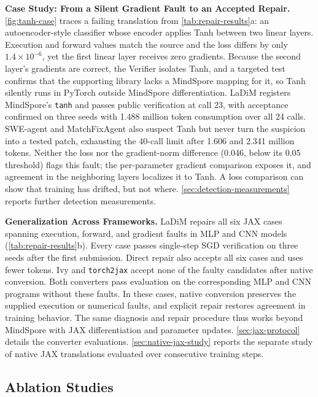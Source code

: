 \textbf{Case Study: From a Silent Gradient Fault to an Accepted Repair.} \cref{fig:tanh-case} traces a failing translation from \cref{tab:repair-results}a: an autoencoder-style classifier whose encoder applies Tanh between two linear layers. Execution and forward values match the source and the loss differs by only $1.4\times10^{-6}$, yet the first linear layer receives zero gradients. Because the second layer's gradients are correct, the Verifier isolates Tanh, and a targeted test confirms that the supporting library lacks a MindSpore mapping for it, so Tanh silently runs in PyTorch outside MindSpore differentiation. LaDiM registers MindSpore's \texttt{tanh} and passes public verification at call 23, with acceptance confirmed on three seeds with 1.488 million token consumption over all 24 calls. SWE-agent and MatchFixAgent also suspect Tanh but never turn the suspicion into a tested patch, exhausting the 40-call limit after 1.606 and 2.341 million tokens. Neither the loss nor the gradient-norm difference (0.046, below its 0.05 threshold) flags this fault; the per-parameter gradient comparison exposes it, and agreement in the neighboring layers localizes it to Tanh. A loss comparison can show that training has drifted, but not where. \cref{sec:detection-measurements} reports further detection measurements.

\textbf{Generalization Across Frameworks.}
\label{sec:generalization}
LaDiM repairs all six JAX cases spanning execution, forward, and gradient faults in MLP and CNN models (\cref{tab:repair-results}b). Every case passes single-step SGD verification on three seeds after the first submission. Direct repair also accepts all six cases and uses fewer tokens. Ivy and \texttt{torch2jax} accept none of the faulty candidates after native conversion. Both converters pass evaluation on the corresponding MLP and CNN programs without these faults. In these cases, native conversion preserves the supplied execution or numerical faults, and explicit repair restores agreement in training behavior. The same diagnosis and repair procedure thus works beyond MindSpore with JAX differentiation and parameter updates. \cref{sec:jax-protocol} details the converter evaluations. \cref{sec:native-jax-study} reports the separate study of native JAX translations evaluated over consecutive training steps.

\subsection{Ablation Studies}
\label{sec:ablations}

